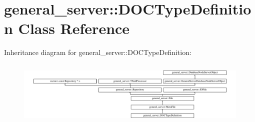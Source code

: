 \hypertarget{classgeneral__server_1_1DOCTypeDefinition}{\section{general\-\_\-server\-:\-:\-D\-O\-C\-Type\-Definition \-Class \-Reference}
\label{classgeneral__server_1_1DOCTypeDefinition}
}
\-Inheritance diagram for general\-\_\-server\-:\-:\-D\-O\-C\-Type\-Definition\-:\begin{figure}[H]
\begin{center}
\leavevmode
\includegraphics[height=3.146067cm]{classgeneral__server_1_1DOCTypeDefinition}
\end{center}
\end{figure}
